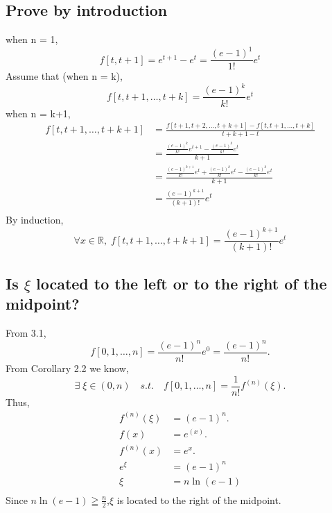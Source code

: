 \documentclass[UTF8]{ctexart}
\begin{document}
\subsection{Prove by introduction}
\noindent when n = 1,
$$f[t,t+1] = e^{t+1} - e^t = \frac{(e-1)^1}{1!}e^t$$
Assume that (when n = k),
$$f[t,t+1,\dots,t+k] = \frac{(e-1)^k}{k!}e^t$$
when n = k+1,
\begin{equation}
    \begin{aligned}
        f[t,t+1,\dots,t+k+1] &= \frac{f[t+1,t+2,\dots,t+k+1] - f[t,t+1,\dots,t+k]}{t+k+1 - t}\\
        &= \frac{\frac{(e-1)^{k}}{k!}e^{t+1} - \frac{(e-1)^k}{k!}e^t}{k+1}\\
        &= \frac{\frac{(e-1)^{k+1}}{k!}e^{t} + \frac{(e-1)^{k}}{k!}e^{t} - \frac{(e-1)^k}{k!}e^t}{k+1}\\
        &= \frac{(e-1)^{k+1}}{(k+1)!}e^{t}\\
    \nonumber
    \end{aligned}
\end{equation}
By induction,
$$\forall x \in \mathbb{R} , \; f[t,t+1,\dots,t+k+1] = \frac{(e-1)^{k+1}}{(k+1)!}e^{t}$$

\subsection{Is $\xi$ located to the left or to the right of the midpoint?}
\noindent From 3.1,
$$f[0,1,\dots,n] = \frac{(e-1)^{n}}{n!}e^{0} = \frac{(e-1)^{n}}{n!}.$$
From Corollary 2.2 we know,
$$\exists \; \xi \in (0,n) \quad s.t. \quad f[0,1,\dots,n] = \frac{1}{n!}f^{(n)}(\xi).$$
Thus,
\begin{equation}
    \begin{aligned}
            f^{(n)}(\xi) &= (e-1)^{n}.\\
            f(x) &= e^(x).\\
            f^{(n)}(x) &= e^{x}.\\
            e^{\xi} &= (e-1)^n\\
            \xi &= n \ln (e - 1)\\
       \nonumber 
    \end{aligned}
\end{equation}
Since $n \ln (e - 1) \geqq \frac{n}{2}$,\quad$\xi$ is located to the right of the midpoint.

\section{}
\end{document}
